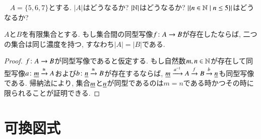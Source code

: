 \begin{exercise}~
\sexc $A=\{5,6,7\}$とする. $|A|$はどうなるか?
\next $|{\mathbb N}|$はどうなるか? 
\next $|\{n\in{\mathbb N}{\;|\;}n\leq 5\}|$はどうなるか?
\endsexc
\end{exercise}

\begin{lemma}


$A$と$B$を有限集合とする. もし集合間の同型写像$f\colon A\rightarrow B$が存在したならば, 二つの集合は同じ濃度を持つ, すなわち$|A|=|B|$である.

\end{lemma}

\begin{proof}


$f\colon A\rightarrow B$が同型写像であると仮定する. もし自然数$m,n\in{\mathbb N}$が存在して同型写像$a\colon\underline{m}\xrightarrow{\cong} A$および$b\colon\underline{n}\xrightarrow{\cong} B$が存在するならば, $\ul{m}\To{a^\m1}A\To{f}B\To{b}\ul{n}$も同型写像である. 帰納法により, 集合$\underline{m}$と$\underline{n}$が同型であるのは$m=n$である時かつその時に限られることが証明できる.

\end{proof}



\section{可換図式}\label{sec:comm diag}


